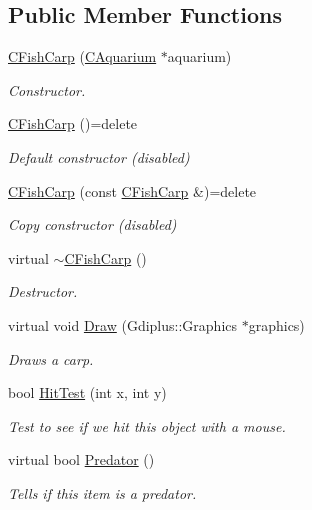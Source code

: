 \subsection*{Public Member Functions}
\begin{DoxyCompactItemize}
\item 
\hyperlink{class_c_fish_carp_a9bc5ff482658f5b8f09e6d71a143a3e8}{C\+Fish\+Carp} (\hyperlink{class_c_aquarium}{C\+Aquarium} $\ast$aquarium)
\begin{DoxyCompactList}\small\item\em Constructor. \end{DoxyCompactList}\item 
\mbox{\label{class_c_fish_carp_a847ccf58041fd6f5aabac7e2ecc9c0d3}} 
\hyperlink{class_c_fish_carp_a847ccf58041fd6f5aabac7e2ecc9c0d3}{C\+Fish\+Carp} ()=delete
\begin{DoxyCompactList}\small\item\em Default constructor (disabled) \end{DoxyCompactList}\item 
\mbox{\label{class_c_fish_carp_a9e7c1ef8083fab86d02544b785431f94}} 
\hyperlink{class_c_fish_carp_a9e7c1ef8083fab86d02544b785431f94}{C\+Fish\+Carp} (const \hyperlink{class_c_fish_carp}{C\+Fish\+Carp} \&)=delete
\begin{DoxyCompactList}\small\item\em Copy constructor (disabled) \end{DoxyCompactList}\item 
virtual \hyperlink{class_c_fish_carp_a5f223a99f88b027ac08287ca18f31444}{$\sim$\+C\+Fish\+Carp} ()
\begin{DoxyCompactList}\small\item\em Destructor. \end{DoxyCompactList}\item 
virtual void \hyperlink{class_c_fish_carp_af0c967b07054d90f7b5c2fbfff9e95fb}{Draw} (Gdiplus\+::\+Graphics $\ast$graphics)
\begin{DoxyCompactList}\small\item\em Draws a carp. \end{DoxyCompactList}\item 
bool \hyperlink{class_c_fish_carp_a8e5c6ea5402085533d7535d4524f7fd6}{Hit\+Test} (int x, int y)
\begin{DoxyCompactList}\small\item\em Test to see if we hit this object with a mouse. \end{DoxyCompactList}\item 
virtual bool \hyperlink{class_c_fish_carp_a16a7a5c00b88e1f2ab3fd2db928bd5aa}{Predator} ()
\begin{DoxyCompactList}\small\item\em Tells if this item is a predator. \end{DoxyCompactList}\end{DoxyCompactItemize}
